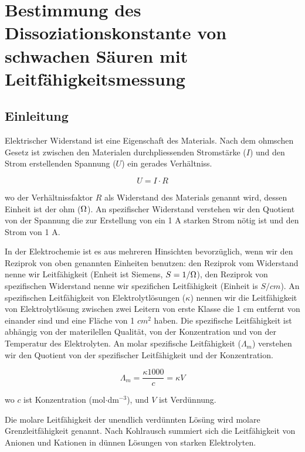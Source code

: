 \section{Bestimmung des Dissoziationskonstante von schwachen Säuren mit Leitfähigkeitsmessung}
\subsection{Einleitung}

Elektrischer Widerstand ist eine Eigenschaft des Materials. Nach dem ohmschen Gesetz ist zwischen den Materialen durchpliessenden Stromstärke ($I$) und den Strom erstellenden Spannung ($U$) ein gerades Verhältniss.


\begin{equation}
\label{eq:ohm}
	U
	=
	I
	\cdot
	R
\end{equation}

wo der Verhältnissfaktor $R$ als Widerstand des Materials genannt wird, dessen Einheit ist der ohm ($\ohm$).
An spezifischer Widerstand verstehen wir den Quotient von der Spannung die zur Erstellung von ein 1 A starken Strom nötig ist und den Strom von 1 A. %

In der Elektrochemie ist es aus mehreren Hinsichten bevorzüglich, wenn wir den Reziprok von oben genannten Einheiten benutzen: den Reziprok vom Widerstand nenne wir Leitfähigkeit (Enheit ist Siemens, $S = 1 / \ohm$), den Reziprok von spezifischen Widerstand nenne wir spezifichen Leitfähigkeit (Einheit is $S/cm$).
An spezifischen Leitfähigkeit von Elektrolytlösungen ($\kappa$) nennen wir die Leitfähigkeit von Elektrolytlösung zwischen zwei Leitern von erste Klasse die 1 cm entfernt von einander sind und eine Fläche von 1 $cm^2$ haben.
Die spezifische Leitfähigkeit ist abhängig von der materilellen Qualität, von der Konzentration und von der Temperatur des Elektrolyten.
An molar spezifische Leitfähigkeit ($\Lambda _m$) verstehen wir den Quotient von der spezifischer Leitfähigkeit und der Konzentration.

\begin{equation}
\label{eq:lambdam}
        \Lambda_m
        =
        \frac
		{\kappa 1000 }
		{c}
	=
	\kappa V
\end{equation}

wo $c$ ist Konzentration (mol$\cdot$dm$^{-3}$), und $V$ ist Verdünnung.

Die molare Leitfähigkeit der unendlich verdünnten Lösüng wird molare Grenzleitfähigkeit genannt.
Nach Kohlrausch summiert sich die Leitfähigkeit von Anionen und Kationen in dünnen Lösungen von starken Elektrolyten. 

